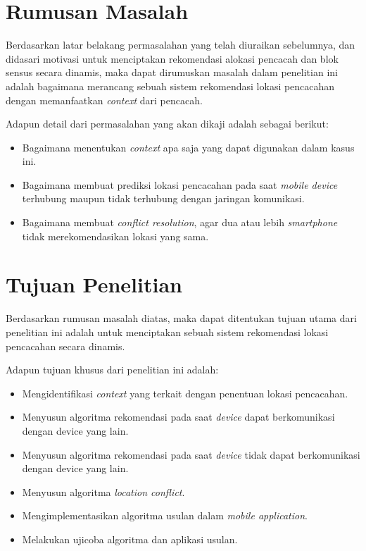 \section{Rumusan Masalah}

Berdasarkan latar belakang permasalahan yang telah diuraikan sebelumnya, dan didasari motivasi untuk menciptakan rekomendasi alokasi pencacah dan blok sensus secara dinamis, maka dapat dirumuskan masalah dalam penelitian ini adalah bagaimana merancang sebuah sistem rekomendasi lokasi pencacahan dengan memanfaatkan \textit{context} dari pencacah.


Adapun detail dari permasalahan yang akan dikaji adalah sebagai berikut:

\begin{itemize}
\item Bagaimana menentukan \textit{context} apa saja yang dapat digunakan dalam kasus ini.
\item Bagaimana membuat prediksi lokasi pencacahan pada saat \textit{mobile device} terhubung maupun tidak terhubung dengan jaringan komunikasi.
\item Bagaimana membuat \textit{conflict resolution}, agar dua atau lebih \textit{smartphone} tidak merekomendasikan lokasi yang sama.
\end{itemize}


\section{Tujuan Penelitian}

Berdasarkan rumusan masalah diatas, maka dapat ditentukan tujuan utama dari penelitian ini adalah untuk menciptakan sebuah sistem rekomendasi lokasi pencacahan secara dinamis. 

Adapun tujuan khusus dari penelitian ini adalah:

\begin{itemize}
\item Mengidentifikasi \textit{context} yang terkait dengan penentuan lokasi pencacahan.
\item Menyusun algoritma rekomendasi pada saat \textit{device} dapat berkomunikasi dengan device yang lain.
\item Menyusun algoritma rekomendasi pada saat \textit{device} tidak dapat berkomunikasi dengan device yang lain.
\item Menyusun algoritma \textit{location conflict}.
\item Mengimplementasikan algoritma usulan dalam \textit{mobile application}.
\item Melakukan ujicoba algoritma dan aplikasi usulan.
\end{itemize}


